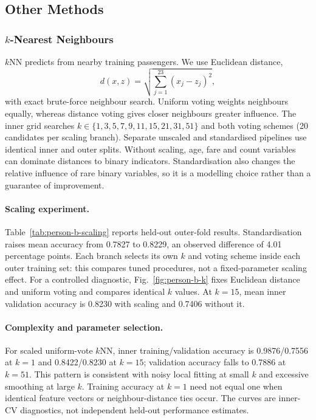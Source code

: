 \documentclass[10pt,twocolumn]{article}
\begin{document}
\subsection{Other Methods}
\subsubsection{$k$-Nearest Neighbours}

$k$NN predicts from nearby training passengers. We use Euclidean distance,
\[
 d(x,z)=\sqrt{\sum_{j=1}^{23}(x_j-z_j)^2},
\]
with exact brute-force neighbour search. Uniform voting weights neighbours equally, whereas distance voting gives closer neighbours greater influence.
The inner grid searches $k\in\{1,3,5,7,9,11,15,21,31,51\}$ and both voting schemes (20 candidates per scaling branch).
Separate unscaled and standardised pipelines use identical inner and outer splits.
Without scaling, age, fare and count variables can dominate distances to binary indicators.
Standardisation also changes the relative influence of rare binary variables, so it is a modelling choice rather than a guarantee of improvement.

\paragraph{Scaling experiment.}
Table~\ref{tab:person-b-scaling} reports held-out outer-fold results.
Standardisation raises mean accuracy from 0.7827 to 0.8229, an observed difference of 4.01 percentage points.
Each branch selects its own $k$ and voting scheme inside each outer training set: this compares tuned procedures, not a fixed-parameter scaling effect.
For a controlled diagnostic, Fig.~\ref{fig:person-b-k} fixes Euclidean distance and uniform voting and compares identical $k$ values.
At $k=15$, mean inner validation accuracy is 0.8230 with scaling and 0.7406 without it.

\paragraph{Complexity and parameter selection.}
For scaled uniform-vote $k$NN, inner training/validation accuracy is 0.9876/0.7556 at $k=1$ and 0.8422/0.8230 at $k=15$; validation accuracy falls to 0.7886 at $k=51$.
This pattern is consistent with noisy local fitting at small $k$ and excessive smoothing at large $k$.
Training accuracy at $k=1$ need not equal one when identical feature vectors or neighbour-distance ties occur.
The curves are inner-CV diagnostics, not independent held-out performance estimates.
\end{document}
